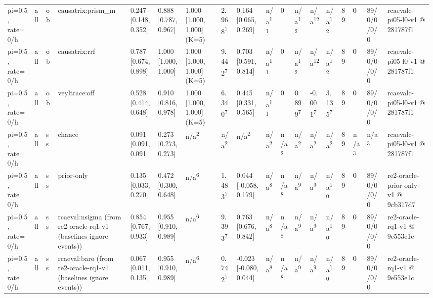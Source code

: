 \begin{table}[t]
\begin{tabular}{llllllllllllllllll}
pi=0.5, rate=0/h & all & ob & causatrix:prism\_m & 0.247 [0.148, 0.352] & 0.888 [0.787, 0.967] & 1.000 [1.000, 1.000] (K=5) & 2.968\textsuperscript{7} & 0.164 [0.065, 0.269] & n/a\textsuperscript{11} & 0 & n/a\textsuperscript{12} & n/a\textsuperscript{12} & n/a\textsuperscript{12} & 89 & 0 & 89/0/0/0/0 & rcaevalc-pi05-l0-v1 @ 281787f1 \\
pi=0.5, rate=0/h & all & ob & causatrix:rrf & 0.787 [0.674, 0.898] & 1.000 [1.000, 1.000] & 1.000 [1.000, 1.000] (K=5) & 9.442\textsuperscript{7} & 0.703 [0.591, 0.814] & n/a\textsuperscript{11} & 0 & n/a\textsuperscript{12} & n/a\textsuperscript{12} & n/a\textsuperscript{12} & 89 & 0 & 89/0/0/0/0 & rcaevalc-pi05-l0-v1 @ 281787f1 \\
pi=0.5, rate=0/h & all & ob & veyltrace:off & 0.528 [0.414, 0.648] & 0.910 [0.816, 0.978] & 1.000 [1.000, 1.000] (K=5) & 6.340\textsuperscript{7} & 0.445 [0.331, 0.565] & n/a\textsuperscript{11} & 0 & 0.899\textsuperscript{7} & -0.001\textsuperscript{7} & 3.135\textsuperscript{7} & 89 & 0 & 89/0/0/0/0 & rcaevalc-pi05-l0-v1 @ 281787f1 \\
pi=0.5, rate=0/h & all & ss & chance & 0.091 [0.091, 0.091] & 0.273 [0.273, 0.273] & n/a\textsuperscript{2} & n/a\textsuperscript{2} & n/a\textsuperscript{2} & n/a\textsuperscript{2} & n/a\textsuperscript{2} & n/a\textsuperscript{2} & n/a\textsuperscript{2} & n/a\textsuperscript{2} & 89 & n/a\textsuperscript{3} & n/a\textsuperscript{3} & rcaevalc-pi05-l0-v1 @ 281787f1 \\
pi=0.5, rate=0/h & all & ss & prior-only & 0.135 [0.033, 0.270] & 0.472 [0.300, 0.648] & n/a\textsuperscript{6} & 1.483\textsuperscript{7} & 0.044 [-0.058, 0.179] & n/a\textsuperscript{8} & n/a\textsuperscript{8} & n/a\textsuperscript{9} & n/a\textsuperscript{9} & n/a\textsuperscript{10} & 89 & 0 & 89/0/0/0/0 & re2-oracle-prior-only-v1 @ 9cb317d7 \\
pi=0.5, rate=0/h & all & ss & rcaeval:nsigma (from re2-oracle-rq1-v1 (baselines ignore events)) & 0.854 [0.767, 0.933] & 0.955 [0.910, 0.989] & n/a\textsuperscript{6} & 9.393\textsuperscript{7} & 0.763 [0.676, 0.842] & n/a\textsuperscript{8} & n/a\textsuperscript{8} & n/a\textsuperscript{9} & n/a\textsuperscript{9} & n/a\textsuperscript{10} & 89 & 0 & 89/0/0/0/0 & re2-oracle-rq1-v1 @ 9e553e1c \\
pi=0.5, rate=0/h & all & ss & rcaeval:baro (from re2-oracle-rq1-v1 (baselines ignore events)) & 0.067 [0.011, 0.135] & 0.955 [0.910, 0.989] & n/a\textsuperscript{6} & 0.742\textsuperscript{7} & -0.023 [-0.080, 0.044] & n/a\textsuperscript{8} & n/a\textsuperscript{8} & n/a\textsuperscript{9} & n/a\textsuperscript{9} & n/a\textsuperscript{10} & 89 & 0 & 89/0/0/0/0 & re2-oracle-rq1-v1 @ 9e553e1c \\

\end{tabular}
\end{table}
